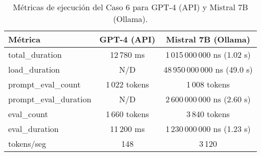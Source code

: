
\begin{table}[h!]
\centering
\begin{tabular}{|l|c|c|}
\hline
\textbf{Métrica} & \textbf{GPT-4 (API)} & \textbf{Mistral 7B (Ollama)} \\
\hline
total\_duration & 12\,780 ms & 1\,015\,000\,000 ns (1.02 s) \\
load\_duration & N/D & 48\,950\,000\,000 ns (49.0 s) \\
prompt\_eval\_count & 1\,022 tokens & 1\,008 tokens \\
prompt\_eval\_duration & N/D & 2\,600\,000\,000 ns (2.60 s) \\
eval\_count & 1\,660 tokens & 3\,840 tokens \\
eval\_duration & 11\,200 ms & 1\,230\,000\,000 ns (1.23 s) \\
tokens/seg & 148 & 3\,120 \\
\hline
\end{tabular}
\caption{Métricas de ejecución del Caso 6 para GPT-4 (API) y Mistral 7B (Ollama).}
\end{table}

